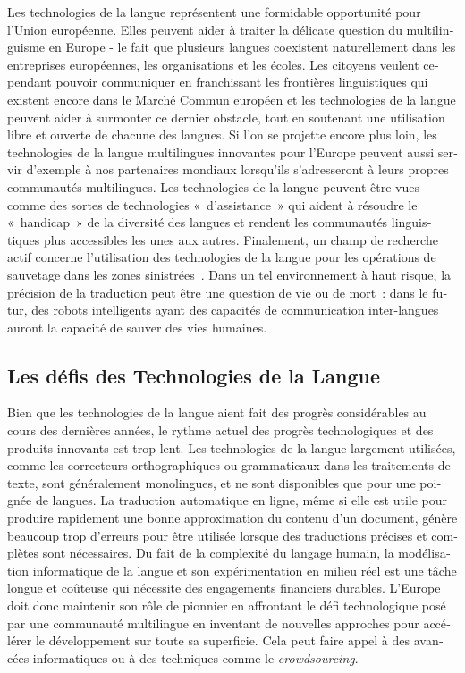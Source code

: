 \begin{french}
\begin{multicols}{2}
Les technologies de la langue représentent une formidable opportunité
pour l'Union européenne. Elles peuvent aider à traiter la
délicate question du multilinguisme en Europe - le fait que plusieurs
langues coexistent naturellement dans les entreprises européennes, les
organisations et les écoles. Les citoyens veulent cependant pouvoir
communiquer en franchissant les frontières linguistiques qui existent
encore dans le Marché Commun européen et les technologies de la langue
peuvent aider à surmonter ce dernier obstacle, tout en soutenant une
utilisation libre et ouverte de chacune des langues. Si l'on
se projette encore plus loin, les technologies de la langue
multilingues innovantes pour l'Europe peuvent aussi servir
d'exemple à nos partenaires mondiaux lorsqu'ils
s'adresseront à leurs propres communautés multilingues. Les
technologies de la langue peuvent être vues comme des sortes de
technologies «~d'assistance~» qui aident à résoudre le
«~handicap~» de la diversité des langues et rendent les communautés
linguistiques plus accessibles les unes aux autres. Finalement, un
champ de recherche actif concerne l'utilisation des
technologies de la langue pour les opérations de sauvetage dans les
zones sinistrées~\cite{resnick2011}. Dans un tel environnement à haut
risque, la précision de la traduction peut être une question de vie ou
de mort~: dans le futur, des robots intelligents ayant des capacités
de communication inter-langues auront la capacité de sauver des vies
humaines.

\subsection{Les défis des Technologies de la Langue}

Bien que les technologies de la langue aient fait des progrès
considérables au cours des dernières années, le rythme actuel des
progrès technologiques et des produits innovants est trop lent. Les
technologies de la langue largement utilisées, comme les correcteurs
orthographiques ou grammaticaux dans les traitements de texte, sont
généralement monolingues, et ne sont disponibles que pour une poignée
de langues. La traduction automatique en ligne, même si elle est utile
pour produire rapidement une bonne approximation du contenu d'un document, génère beaucoup trop d'erreurs pour être
utilisée lorsque des traductions précises et complètes sont
nécessaires. Du fait de la complexité du langage humain, la
modélisation informatique de la langue et son expérimentation en
milieu réel est une tâche longue et coûteuse qui nécessite des
engagements financiers durables. L'Europe doit donc maintenir
son rôle de pionnier en affrontant le défi technologique posé par une
communauté multilingue en inventant de nouvelles approches pour
accélérer le développement sur toute sa superficie. Cela peut faire
appel à des avancées informatiques ou à des techniques comme le {\it
  crowdsourcing}.


\end{multicols}
\end{french}
